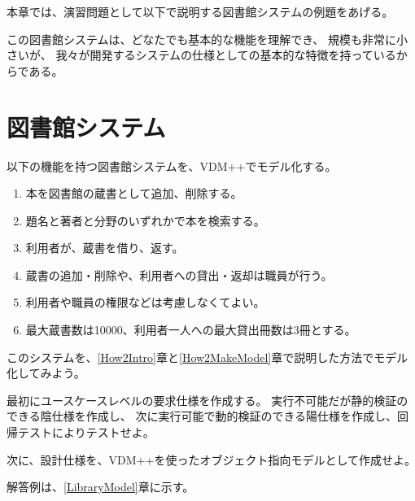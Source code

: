 本章では、演習問題として以下で説明する図書館システムの例題をあげる。

この図書館システムは、どなたでも基本的な機能を理解でき、
規模も非常に小さいが、
我々が開発するシステムの仕様としての基本的な特徴を持っているからである。

\section {図書館システム}
	\label{LibraryRequirement}
以下の機能を持つ図書館システムを、VDM++でモデル化する。

\begin{enumerate}
\item 本を図書館の蔵書として追加、削除する。
\item 題名と著者と分野のいずれかで本を検索する。
\item 利用者が、蔵書を借り、返す。
\item 蔵書の追加・削除や、利用者への貸出・返却は職員が行う。
\item 利用者や職員の権限などは考慮しなくてよい。
\item 最大蔵書数は10000、利用者一人への最大貸出冊数は3冊とする。
\end{enumerate}

このシステムを、\ref{How2Intro}章と\ref{How2MakeModel}章で説明した方法でモデル化してみよう。

最初にユースケースレベルの要求仕様を作成する。
実行不可能だが静的検証のできる陰仕様を作成し、
次に実行可能で動的検証のできる陽仕様を作成し、回帰テストによりテストせよ。

次に、設計仕様を、VDM++を使ったオブジェクト指向モデルとして作成せよ。

解答例は、\ref{LibraryModel}章に示す。